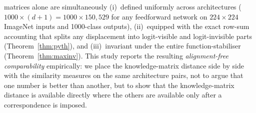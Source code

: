 matrices alone are simultaneously
(i)~defined uniformly across architectures
($1000 \times (d{+}1) = 1000 \times 150{,}529$ for any feedforward
network on $224\times224$ ImageNet inputs and 1000-class outputs),
(ii)~equipped with the exact row-sum accounting that splits any
displacement into logit-visible and logit-invisible parts
(Theorem~\ref{thm:pyth}), and (iii)~invariant under the entire
function-stabiliser (Theorem~\ref{thm:maxinv}). This study reports the
resulting \emph{alignment-free comparability} empirically: we place the
knowledge-matrix distance side by side with the similarity measures on
the same architecture pairs, not to argue that one number is better than
another, but to show that the knowledge-matrix distance is available
directly where the others are available only after a correspondence is
imposed.

